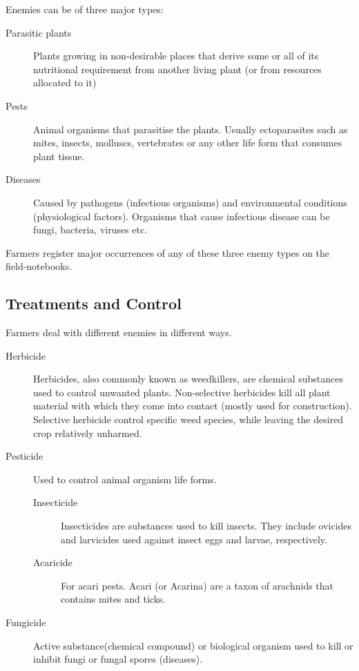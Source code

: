 Enemies can be of three major types:
\begin{description}
	\item [Parasitic plants] Plants growing in non-desirable places that derive some or all of its nutritional requirement from another living plant (or from resources allocated to it)
	\item [Pests] Animal organisms that parasitise the plants.  Usually ectoparasites such as mites, insects, molluscs, vertebrates or any other life form that consumes plant tissue.
	\item [Diseases] Caused by pathogens (infectious organisms) and environmental conditions (physiological factors). Organisms that cause infectious disease can be fungi, bacteria, viruses etc.
\end{description}

Farmers register major occurrences of any of these three enemy types on the field-notebooks.

\subsection{Treatments and Control}
\label{sec:problem_spreadsheets_control}

Farmers deal with different enemies in different ways. 

\begin{description}
	\item [Herbicide] Herbicides, also commonly known as weedkillers, are chemical substances used to control unwanted plants. Non-selective herbicides kill all plant material with which they come into contact (mostly used for construction). Selective herbicide control specific weed species, while leaving the desired crop relatively unharmed.
	\item [Pesticide] Used to control animal organism life forms.
	\begin{description}
		\item [Insecticide] Insecticides are substances used to kill insects. They include ovicides and larvicides used against insect eggs and larvae, respectively.
		\item [Acaricide] For acari pests. Acari (or Acarina) are a taxon of arachnids that contains mites and ticks.
	\end{description}
	\item [Fungicide] Active substance(chemical compound) or biological organism used to kill or inhibit fungi or fungal spores (diseases).
\end{description}

